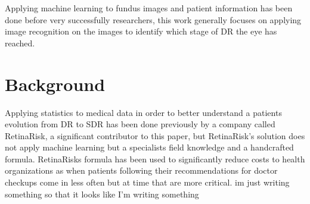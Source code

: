 Applying machine learning to fundus images and patient information has been done before very successfully 
researchers\cite{Intro_googleDeepmind}, this work generally focuses on applying image recognition on 
the images to identify which stage of DR the eye has reached. 

\section{Background}

Applying statistics to medical data in order to better understand a patients evolution from DR to SDR 
has been done previously by a company called RetinaRisk, a significant contributor to this paper, but 
RetinaRisk's solution does not apply machine learning but a specialists field knowledge and a handcrafted 
formula. RetinaRisks formula has been used to significantly reduce costs to health organizations as 
when patients following their recommendations for doctor checkups come in less often but at time that 
are more critical. im just writing something so that it looks like I'm writing something
